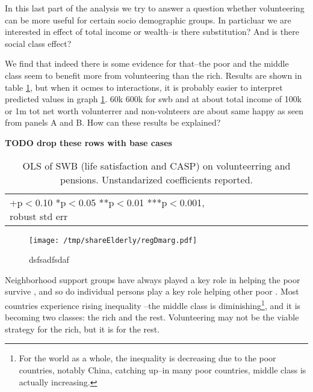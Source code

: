 \documentclass[10pt, letterpaper]{article}
\begin{document}
\begin{spacing}{1.4}
In this last part of the analysis we try to answer a question whether
volunteering can be more useful for certain socio demographic groups. In
particluar we are interested in effect of total income or wealth--is there
substitution? And is there social class effect?

We find that indeed there is some evidence for that--the poor and the middle
class seem to benefit more from volunteering than the rich. Results are shown in
table \ref{regDw6}, but when it ocmes to interactions, it is probably easier to
interpret predicted values in graph \ref{mar}.
%
60k 600k for swb and 
at about total income of 100k or 1m tot net worth volunterrer and non-volnteers
are about same happy as seen from panels A and B.
% 
How can these results be explained?

\textbf{TODO drop these rows with base cases}
\begin{spacing}{.9}
\begin{table}[H]\centering \caption{OLS of SWB  (life satisfaction and CASP) on
    volunteerring and pensions.  Unstandarized coefficients reported.}  \begin{scriptsize} \begin{tabular}{p{1.8in}p{.5in}p{.5in}p{.5in}p{.5in}|p{.5in}p{.5in}p{.5in}p{.5in}p{.5in}p{.4in}p{.5in}p{.4in}}\hline 
      \hline\multicolumn{5}{l}{+p$<$0.10 *p$<$0.05 **p$<$0.01 ***p$<$0.001,
        robust std err} \end{tabular}\label{regDw6} \end{scriptsize}\end{table}
\end{spacing}


\begin{figure}[h!]
  \centering
\texttt{[image: /tmp/shareElderly/regDmarg.pdf]}  
  \caption{dsfsadfsdaf}
  \label{mar}
\end{figure}




Neighborhood support groups have always played a key role in helping the poor
survive \citep{saegert2002social}, and so do individual persons play a key role
helping other poor \citep{mazelis2017surviving}. Most countries experience
rising inequality \citep{piketty03,mackintosh13,oecd08,verbeek15}--the middle
class is diminishing\footnote{For the world as a whole, the inequality is
  decreasing due to the poor countries, notably China, catching up--in many poor
  countries, middle class is actually increasing.}, and it is becoming two classes: the rich and the
rest. Volunteering may not be the viable strategy for the rich, but it is for the rest. 



\end{spacing}
\end{document}
